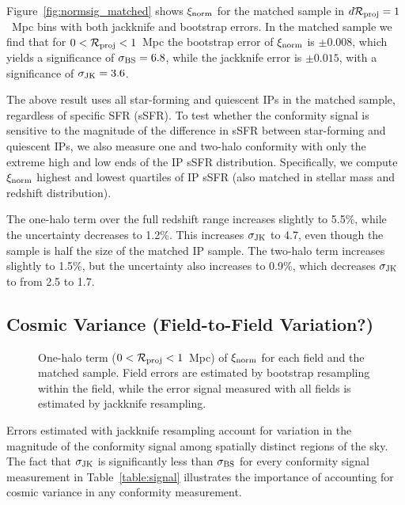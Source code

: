 Figure~\ref{fig:normsig_matched} shows $\signorm$ for the matched sample in ${d\mathcal{R}_{\text{proj}}=1}$~Mpc bins with both jackknife and bootstrap errors.
In the matched sample we find that for ${0<\mathcal{R}_{\text{proj}}<1}$~Mpc the bootstrap error of $\signorm$ is ${\pm0.008}$, which yields a significance of $\sigmaBS=6.8$, while the jackknife error is ${\pm0.015}$, with a significance of $\sigmaJK=3.6$.
 
The above result uses all star-forming and quiescent IPs in the matched sample, regardless of specific SFR (sSFR).  
To test whether the conformity signal is sensitive to the magnitude of the difference in sSFR between star-forming and quiescent IPs, we also measure one and two-halo conformity with only the extreme high and low ends of the IP sSFR distribution.  Specifically, we compute $\signorm$ highest and lowest quartiles of IP sSFR (also matched in stellar mass and redshift distribution).

The one-halo term over the full redshift range increases slightly to 5.5\%, while the uncertainty decreases to 1.2\%.
This increases $\sigmaJK$ to 4.7, even though the sample is half the size of the matched IP sample.
The two-halo term increases slightly to 1.5\%, but the uncertainty also increases to 0.9\%, which decreases $\sigmaJK$ to from 2.5 to 1.7.

\subsection{Cosmic Variance (Field-to-Field Variation?)}\label{sec:cosmic_var}

\begin{figure}
  \epstrim{0.4in 0.7in 0.3in 0.3in}
  \caption{
One-halo term ($0<\mathcal{R}_{\text{proj}}<1$~Mpc) of $\signorm$ for each field and the matched sample.
Field errors are estimated by bootstrap resampling within the field, while the error signal measured with all fields is estimated by jackknife resampling.
}
  \label{fig:normsig_fields_1halo}
\end{figure}



Errors estimated with jackknife resampling account for variation in the 
magnitude of the conformity signal among spatially distinct regions of the sky.
The fact that $\sigmaJK$ is significantly less than $\sigmaBS$ for every conformity signal measurement in Table~\ref{table:signal}
illustrates the importance of accounting for cosmic variance in any conformity measurement.

